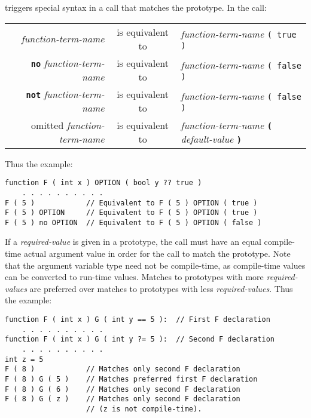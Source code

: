 \documentclass[12pt]{article}
\newcommand{\TT}[1]{{\tt \bfseries #1}}
\newenvironment{indpar}[1][0.3in]%
	{\begin{list}{}%
		     {\setlength{\itemsep}{0in}%
		      \setlength{\topsep}{0in}%
		      \setlength{\parsep}{1ex}%
		      \setlength{\labelwidth}{#1}%
		      \setlength{\leftmargin}{#1}%
		      \addtolength{\leftmargin}{\labelsep}}%
	 \item}%
	{\end{list}}
\begin{document}
triggers special syntax in a call that matches the prototype.
In the call:
\begin{center}
\begin{tabular}{rcl}
{\em function-term-name} & is equivalent to
                         & {\em function-term-name} \tt ( true ) \\
\TT{no} {\em function-term-name} & is equivalent to
                         & {\em function-term-name} \tt ( false ) \\
\TT{not} {\em function-term-name} & is equivalent to
                         & {\em function-term-name} \tt ( false ) \\
omitted {\em function-term-name} & is equivalent to
                         & {\em function-term-name}
			   \TT{(} {\em default-value} \TT{)} \\
\end{tabular}
\end{center}
Thus the example:
\begin{indpar}\begin{verbatim}
function F ( int x ) OPTION ( bool y ?? true )
    . . . . . . . . . .
F ( 5 )            // Equivalent to F ( 5 ) OPTION ( true )
F ( 5 ) OPTION     // Equivalent to F ( 5 ) OPTION ( true )
F ( 5 ) no OPTION  // Equivalent to F ( 5 ) OPTION ( false )
\end{verbatim}\end{indpar}

If a {\em required-value} is given in a prototype, the call must
have an equal compile-time actual argument value
in order for the call to match the prototype.
Note that the argument variable type need not be compile-time,
as compile-time values can be converted to run-time values.
Matches to prototypes with more {\em required-values}
are preferred over matches to prototypes with less {\em required-values}.
Thus the example:
\begin{indpar}\begin{verbatim}
function F ( int x ) G ( int y == 5 ):  // First F declaration
    . . . . . . . . . .
function F ( int x ) G ( int y ?= 5 ):  // Second F declaration
    . . . . . . . . . .
int z = 5
F ( 8 )            // Matches only second F declaration
F ( 8 ) G ( 5 )    // Matches preferred first F declaration
F ( 8 ) G ( 6 )    // Matches only second F declaration
F ( 8 ) G ( z )    // Matches only second F declaration
                   // (z is not compile-time).
\end{verbatim}\end{indpar}
\end{document}
